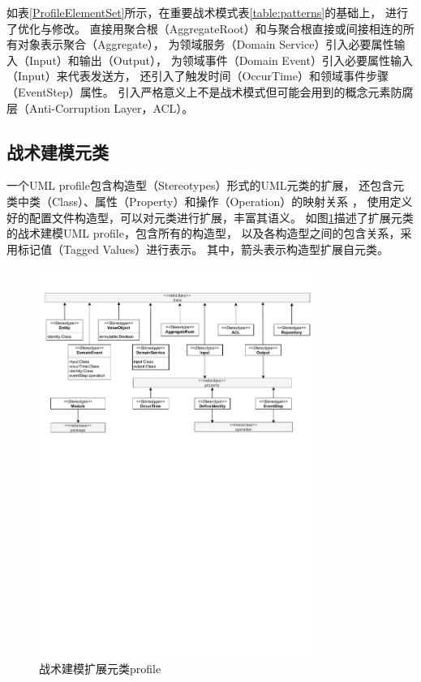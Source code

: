 如表\ref{ProfileElementSet}所示，在重要战术模式表\ref{table:patterns}的基础上，
进行了优化与修改。
直接用聚合根（AggregateRoot）和与聚合根直接或间接相连的所有对象表示聚合（Aggregate），
为领域服务（Domain Service）引入必要属性输入（Input）和输出（Output），
为领域事件（Domain Event）引入必要属性输入（Input）来代表发送方，
还引入了触发时间（OccurTime）和领域事件步骤（EventStep）属性。
引入严格意义上不是战术模式但可能会用到的概念元素防腐层（Anti-Corruption Layer，ACL）。

\subsection{战术建模元类}

一个UML profile包含构造型（Stereotypes）形式的UML元类的扩展，
还包含元类中类（Class）、属性（Property）和操作（Operation）的映射关系
\cite{files2013omg}，
使用定义好的配置文件构造型，可以对元类进行扩展，丰富其语义。
如图\ref{metaclass}描述了扩展元类的战术建模UML profile，包含所有的构造型，
以及各构造型之间的包含关系，采用标记值（Tagged Values）进行表示。
其中，箭头表示构造型扩展自元类。

\begin{figure}[!htb] %
    \centering %
    \includegraphics[width=0.8\textwidth]{FIGs/chapter3/metaclass.pdf} %
    \caption{战术建模扩展元类profile} %
    \label{metaclass} %
\end{figure}%

